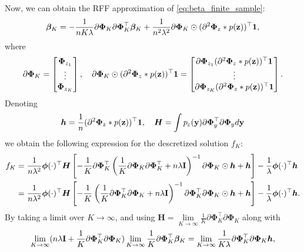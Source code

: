 Now, we can obtain the RFF approximation of \eqref{eq:beta_finite_sample}:
\begin{align*}
    {\bm \beta}_K = -\frac{1}{nK\lambda}\partial {\bm \Phi}_K\partial {\bm \Phi}_K^{\top}{\bm \beta}_K  + \frac{1}{n^2\lambda^2}\partial{\bm \Phi}_K \odot (\partial^2 {\bm \Phi}_z * p({\bf z}))^{\top}{\bf 1},
\end{align*}
where
\[  \partial {\bm \Phi}_K =
    \begin{bmatrix}
        {\bm \Phi}_{z_1}\\
        \vdots\\
        {\bm \Phi}_{z_K}
    \end{bmatrix}, \quad
    \partial{\bm \Phi}_K \odot (\partial^2 {\bm \Phi}_z * p({\bf z}))^{\top}{\bf 1} =
    \begin{bmatrix}
        \partial{\bm \Phi}_{z_1}(\partial^2 {\bm \Phi}_z * p({\bf z}))^{\top}{\bf 1}\\
        \vdots\\
        \partial{\bm \Phi}_{z_K}(\partial^2 {\bm \Phi}_z * p({\bf z}))^{\top}{\bf 1}
    \end{bmatrix}.
\]
Denoting
\begin{equation*}
    {\bm h} = \frac{1}{n}(\partial^2 {\bm \Phi}_z * p({\bf z}))^{\top}{\bf 1},
    \quad
    {\bm H} =
    \int p_{\varepsilon}({\bf y})\partial{\bm \Phi}_y^{\top}\partial{\bm \Phi}_y d{\bf y}
\end{equation*}
we obtain the following expression for the descretized solution $f_K$:
\begin{align*}
    f_K
    &= \frac{1}{n\lambda^2}{\bm \phi}(\cdot)^{\top}{\bm H} \left[-\frac{1}{K}\partial {\bm \Phi}_K^{\top}\left(\frac{1}{K}\partial {\bm \Phi}_K\partial {\bm \Phi}_K^{\top} + n\lambda {\bf I}\right)^{-1}\partial{\bm \Phi}_K \odot {\bm h} + {\bm h}\right]
   -\frac{1}{\lambda} {\bm \phi}(\cdot)^{\top}{\bm h}\\
    &= \frac{1}{n\lambda^2}{\bm \phi}(\cdot)^{\top}{\bm H}
    \left[-\frac{1}{K}\left(\frac{1}{K}\partial  {\bm \Phi}_K^{\top}\partial{\bm \Phi}_K + n\lambda {\bf I}\right)^{-1}\partial {\bm \Phi}_K^{\top}\partial{\bm \Phi}_K \odot {\bm h} + {\bm h}\right]
    -\frac{1}{\lambda} {\bm \phi}(\cdot)^{\top}{\bm h}.
\end{align*}
By taking a limit over $K \to \infty$, and using
${\bm H} = \lim\limits_{K \to \infty}\frac{1}{K}\partial {\bm \Phi}_K^{\top}\partial{\bm\Phi}_K$ along with
\begin{equation*}
    \lim\limits_{K \to \infty}(n\lambda{\bf I} + \frac{1}{K}\partial {\bm \Phi}^{\top}_K\partial {\bm \Phi}_K) \lim\limits_{K \to \infty}\frac{1}{K}\partial {\bm \Phi}^{\top}_K{\bm \beta}_K = \lim\limits_{K \to \infty}\frac{1}{K\lambda}\partial {\bm \Phi}^{\top}_K\partial {\bm \Phi}_K{\bm h},
\end{equation*}
